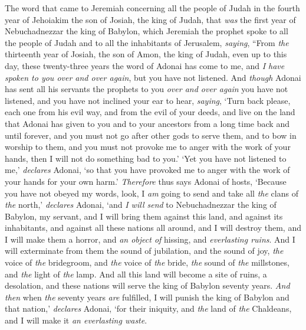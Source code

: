 \begin{biblechapter} %
 The word that came to Jeremiah concerning all the people of Judah in the fourth year of Jehoiakim the son of Josiah, the king of Judah, that \textit{was} the first year of Nebuchadnezzar the king of Babylon,
\verse which Jeremiah the prophet spoke to all the people of Judah and to all the inhabitants of Jerusalem, \textit{saying},
\verse “From \textit{the} thirteenth year of Josiah, the son of Amon, the king of Judah, even up to this day, these twenty-three years the word of Adonai has come to me, and \textit{I have spoken to you over and over again}, but you have not listened.
\verse And \textit{though} Adonai has sent all his servants the prophets to you \textit{over and over again} you have not listened, and you have not inclined your ear to hear,
\verse \textit{saying}, ‘Turn back please, each one from his evil way, and from the evil of your deeds, and live on the land that Adonai has given to you and to your ancestors from a long time back and until forever,
\verse and you must not go after other gods to serve them, and to bow in worship to them, and you must not provoke me to anger with the work of your hands, then I will not do something bad to you.’
\verse ‘Yet you have not listened to me,’ \textit{declares} Adonai, ‘so that you have provoked me to anger with the work of your hands for your own harm.’
\verse \textit{Therefore} thus says Adonai of hosts, ‘Because you have not obeyed my words,
\verse look, I \textit{am} going to send and take all \textit{the} clans of \textit{the} north,’ \textit{declares} Adonai, ‘and \textit{I will send} to Nebuchadnezzar the king of Babylon, my servant, and I will bring them against this land, and against its inhabitants, and against all these nations all around, and I will destroy them, and I will make them a horror, and \textit{an object of} hissing, and \textit{everlasting ruins}.
\verse And I will exterminate from them the sound of jubilation, and the sound of joy, \textit{the} voice of \textit{the} bridegroom, and \textit{the} voice of \textit{the} bride, \textit{the} sound of \textit{the} millstones, and \textit{the} light of \textit{the} lamp.
\verse And all this land will become a site of ruins, a desolation, and these nations will serve the king of Babylon seventy years.
 \textit{And then} when \textit{the} seventy years \textit{are} fulfilled, I will punish the king of Babylon and that nation,’ \textit{declares} Adonai, ‘for their iniquity, and \textit{the} land of \textit{the} Chaldeans, and I will make it \textit{an everlasting waste}.

\end{biblechapter}
